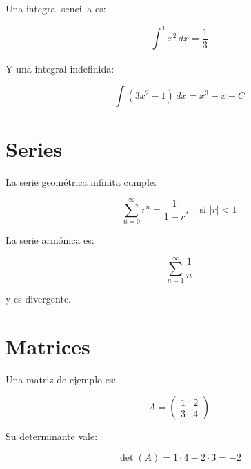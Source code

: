 Una integral sencilla es:

\[
\int_0^1 x^2 \, dx = \frac{1}{3}
\]

Y una integral indefinida:

\[
\int (3x^2 - 1)\,dx = x^3 - x + C
\]

\section{Series}

La serie geométrica infinita cumple:

\[
\sum_{n=0}^{\infty} r^n = \frac{1}{1-r}, \quad \text{si } |r| < 1
\]

La serie armónica es:

\[
\sum_{n=1}^{\infty} \frac{1}{n}
\]

y es divergente.

\section{Matrices}

Una matriz de ejemplo es:

\[
A =
\begin{pmatrix}
1 & 2 \\
3 & 4
\end{pmatrix}
\]

Su determinante vale:

\[
\det(A) = 1 \cdot 4 - 2 \cdot 3 = -2
\]
